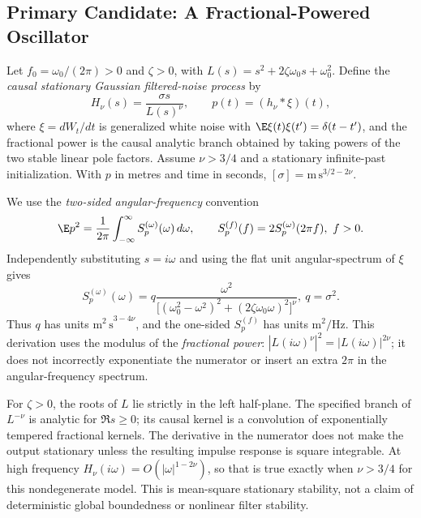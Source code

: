 \subsection{Primary Candidate: A Fractional-Powered Oscillator}
\label{sec:frac-primary}
Let \(f_0=\omega_0/(2\pi)>0\) and \(\zeta>0\), with
\(L(s)=s^2+2\zeta\omega_0s+\omega_0^2\). Define the \emph{causal
stationary Gaussian filtered-noise process} by
\begin{equation}
H_\nu(s)=\frac{\sigma s}{L(s)^\nu},\qquad
p(t)=(h_\nu*\xi)(t),
\label{eq:frac-hnu}
\end{equation}
where \(\xi=dW_t/dt\) is generalized white noise with
\(\E\xi(t)\xi(t')=\delta(t-t')\), and the fractional power is
the causal analytic branch obtained by taking powers of the two stable
linear pole factors. Assume \(\nu>3/4\) and a stationary infinite-past
initialization. With \(p\) in metres and time in seconds,
\([\sigma]=\mathrm{m\,s}^{3/2-2\nu}\).

We use the \emph{two-sided angular-frequency} convention
\begin{equation}
\E p^2=\frac{1}{2\pi}\int_{-\infty}^{\infty}
 S_p^{(\omega)}(\omega)\,d\omega,\qquad
 S_p^{(f)}(f)=2S_p^{(\omega)}(2\pi f),\ f>0.
\label{eq:frac-convention}
\end{equation}
Independently substituting \(s=i\omega\) and using the flat unit
angular-spectrum of \(\xi\) gives
\begin{equation}
\boxed{S_p^{(\omega)}(\omega)=
q\frac{\omega^2}{\bigl[(\omega_0^2-\omega^2)^2+
(2\zeta\omega_0\omega)^2\bigr]^\nu}},\ q=\sigma^2.
\label{eq:frac-psd}
\end{equation}
Thus \(q\) has units \(\mathrm{m^2\,s}^{3-4\nu}\), and the
one-sided \(S_p^{(f)}\) has units \(\mathrm{m^2/Hz}\). This
derivation uses the modulus of the \emph{fractional power}:
\(|L(i\omega)^\nu|^2=|L(i\omega)|^{2\nu}\); it does not
incorrectly exponentiate the numerator or insert an extra
\(2\pi\) in the angular-frequency spectrum.

For \(\zeta>0\), the roots of \(L\) lie strictly in the left
half-plane. The specified branch of \(L^{-\nu}\) is analytic for
\(\Re s\ge0\); its causal kernel is a convolution of exponentially
tempered fractional kernels. The derivative in the numerator does not
make the output stationary unless the resulting impulse response is
square integrable. At high frequency
\(H_\nu(i\omega)=O(|\omega|^{1-2\nu})\), so that is true
exactly when \(\nu>3/4\) for this nondegenerate model.
This is mean-square stationary stability, not a claim of deterministic
global boundedness or nonlinear filter stability.

